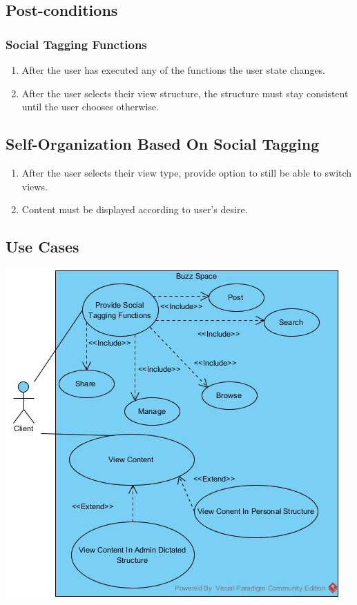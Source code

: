 \documentclass[12pt, oneside]{book}
\begin{document}
\subsection{Post-conditions}
\subsubsection{Social Tagging Functions}    
\begin{enumerate}
\item After the user has executed any of the functions the user state changes.
\item After the user selects their view structure, the structure must stay consistent until the user chooses otherwise.
\end{enumerate}
\subsection{Self-Organization Based On Social Tagging}
\begin{enumerate}
\item After the user selects their view type, provide option to still be able to switch views.
\item Content must be displayed according to user's desire.
\end{enumerate}
\subsection{Use Cases}
  \includegraphics{u29630135_socialTagging.jpg}
    \rule{0\linewidth}{0.03\linewidth}\par
\end{document}
